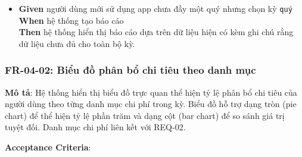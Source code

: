 \begin{itemize}
\item \textbf{Given} người dùng mới sử dụng app chưa đầy một quý nhưng chọn kỳ \texttt{quý}  \\ \hspace*{1.5em}  \textbf{When} hệ thống tạo báo cáo  \\ \hspace*{1.5em}  \textbf{Then} hệ thống hiển thị báo cáo dựa trên dữ liệu hiện có kèm ghi chú rằng dữ liệu chưa đủ cho toàn bộ kỳ.
\end{itemize}
\subsubsection{FR-04-02: Biểu đồ phân bổ chi tiêu theo danh mục}

\textbf{Mô tả}: Hệ thống hiển thị biểu đồ trực quan thể hiện tỷ lệ phân bổ chi tiêu của người dùng theo từng danh mục chi phí trong kỳ. Biểu đồ hỗ trợ dạng tròn (pie chart) để thể hiện tỷ lệ phần trăm và dạng cột (bar chart) để so sánh giá trị tuyệt đối. Danh mục chi phí liên kết với REQ-02.



\textbf{Acceptance Criteria}:


